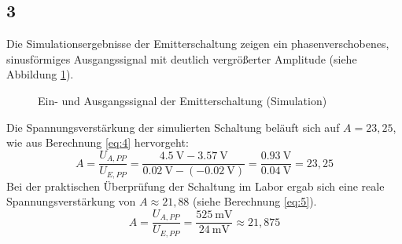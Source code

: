 \subsection*{3}
Die Simulationsergebnisse der Emitterschaltung zeigen ein phasenverschobenes, sinusförmiges Ausgangssignal mit deutlich vergrößerter Amplitude (siehe Abbildung \ref{fig:6}).
\begin{figure}[H]
    \centering
    \caption{Ein- und Ausgangssignal der Emitterschaltung (Simulation)}
    \label{fig:6}
    \end{figure}
Die Spannungsverstärkung der simulierten Schaltung beläuft sich auf $A = 23,25$, wie aus Berechnung \ref{eq:4} hervorgeht:
\begin{equation}
    A = \frac{U_{A,PP}}{U_{E,PP}} = \frac{\SI{4,5}{\volt} - \SI{3,57}{\volt}}{\SI{0,02}{\volt} - (-\SI{0,02}{\volt})} = \frac{\SI{0,93}{\volt}}{\SI{0,04}{\volt}} = 23,25
    \label{eq:4}
\end{equation}
Bei der praktischen Überprüfung der Schaltung im Labor ergab sich eine reale Spannungsverstärkung von $A \approx 21,88$ (siehe Berechnung \ref{eq:5}).
\begin{equation}
    A = \frac{U_{A,PP}}{U_{E,PP}} = \frac{\SI{525}{\milli\volt}}{\SI{24}{\milli\volt}} \approx 21,875
    \label{eq:5}
\end{equation}